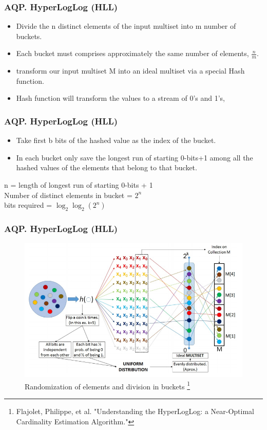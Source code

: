\documentclass{beamer}
\begin{document}
\begin{frame}
\frametitle{AQP. HyperLogLog (HLL)}
\begin{itemize}
	\item{Divide the n distinct elements of the input multiset into m number of buckets.}
	\item{Each bucket must comprises approximately the same number of elements, $\frac{n}{m}$.}
	\item{transform our input multiset M into an ideal multiset via a special Hash function.}
	\item{Hash function will transform the values to a stream of 0’s and 1’s,}
\end{itemize}
\end{frame}

\begin{frame}
\frametitle{AQP. HyperLogLog (HLL)}
\begin{itemize}
	\item{Take first b bits of the hashed value as the index of the bucket.}
	\item{In each bucket only save the longest run of starting 0-bits+1 among all the hashed values of the elements that belong to that bucket.}
	\end{itemize}
	\hspace{0.2cm}n = length of longest run of starting 0-bits + 1\\
	\vspace{0.2cm}
	\hspace{0.2cm}Number of distinct elements in bucket = $2^{n}$\\
	\vspace{0.2cm}
	\hspace{0.2cm}bits required = ${\log_2{\log_2(2^{n})}}$ 
\end{frame}

\begin{frame}
\frametitle{AQP. HyperLogLog (HLL)}
\begin{figure}
  \centering
  \includegraphics[scale=0.38]{img/HLL2.png}
  \caption{ Randomization of elements and division in buckets \footnote{\fontsize{3}{5}\selectfont Flajolet, Philippe, et al. "Understanding the HyperLogLog: a Near-Optimal Cardinality Estimation Algorithm."}}
  \end{figure}
\end{frame}
\end{document}
